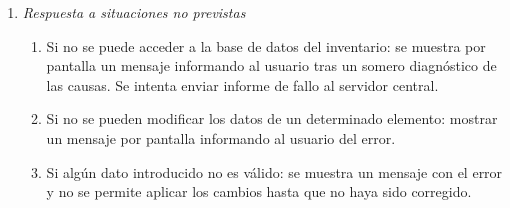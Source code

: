\begin{enumerate}
\begin{enumerate}
	\end{enumerate}
	\item \textit{Respuesta a situaciones no previstas}
	\begin{enumerate}
		\item Si no se puede acceder a la base de datos del inventario: se muestra por pantalla un mensaje informando al usuario tras un somero diagnóstico de las causas. Se intenta enviar informe de fallo al servidor central.
		\item Si no se pueden modificar los datos de un determinado elemento: mostrar un mensaje por pantalla informando al usuario del error.
		\item Si algún dato introducido no es válido: se muestra un mensaje con el error y no se permite aplicar los cambios hasta que no haya sido corregido.
	\end{enumerate}
\end{enumerate}
